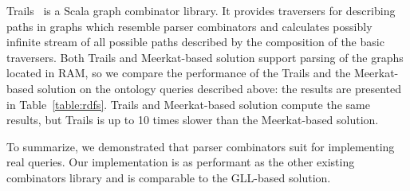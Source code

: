Trails~\cite{ScalaGraphParsing} is a Scala graph combinator library.
It provides traversers for describing paths in graphs which resemble parser combinators and calculates possibly infinite stream of all possible paths described by the composition of the basic traversers.
Both Trails and Meerkat-based solution support parsing of the graphs located in RAM, so we compare the performance of the Trails and the Meerkat-based solution on the ontology queries described above: the results are presented in Table~\ref{table:rdfs}.
Trails and Meerkat-based solution compute the same results, but Trails is up to 10 times slower than the Meerkat-based solution.

To summarize, we demonstrated that parser combinators suit for implementing real queries.
Our implementation is as performant as the other existing combinators library and is comparable to the GLL-based solution.

